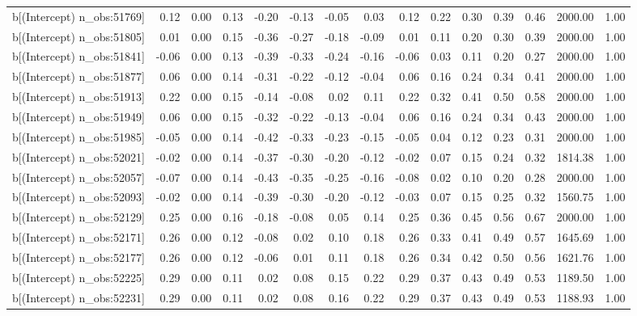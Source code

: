 \begin{table}[ht]
\begin{tabular}{rrrrrrrrrrrrrrr}
  b[(Intercept) n\_obs:51769] & 0.12 & 0.00 & 0.13 & -0.20 & -0.13 & -0.05 & 0.03 & 0.12 & 0.22 & 0.30 & 0.39 & 0.46 & 2000.00 & 1.00 \\ 
  b[(Intercept) n\_obs:51805] & 0.01 & 0.00 & 0.15 & -0.36 & -0.27 & -0.18 & -0.09 & 0.01 & 0.11 & 0.20 & 0.30 & 0.39 & 2000.00 & 1.00 \\ 
  b[(Intercept) n\_obs:51841] & -0.06 & 0.00 & 0.13 & -0.39 & -0.33 & -0.24 & -0.16 & -0.06 & 0.03 & 0.11 & 0.20 & 0.27 & 2000.00 & 1.00 \\ 
  b[(Intercept) n\_obs:51877] & 0.06 & 0.00 & 0.14 & -0.31 & -0.22 & -0.12 & -0.04 & 0.06 & 0.16 & 0.24 & 0.34 & 0.41 & 2000.00 & 1.00 \\ 
  b[(Intercept) n\_obs:51913] & 0.22 & 0.00 & 0.15 & -0.14 & -0.08 & 0.02 & 0.11 & 0.22 & 0.32 & 0.41 & 0.50 & 0.58 & 2000.00 & 1.00 \\ 
  b[(Intercept) n\_obs:51949] & 0.06 & 0.00 & 0.15 & -0.32 & -0.22 & -0.13 & -0.04 & 0.06 & 0.16 & 0.24 & 0.34 & 0.43 & 2000.00 & 1.00 \\ 
  b[(Intercept) n\_obs:51985] & -0.05 & 0.00 & 0.14 & -0.42 & -0.33 & -0.23 & -0.15 & -0.05 & 0.04 & 0.12 & 0.23 & 0.31 & 2000.00 & 1.00 \\ 
  b[(Intercept) n\_obs:52021] & -0.02 & 0.00 & 0.14 & -0.37 & -0.30 & -0.20 & -0.12 & -0.02 & 0.07 & 0.15 & 0.24 & 0.32 & 1814.38 & 1.00 \\ 
  b[(Intercept) n\_obs:52057] & -0.07 & 0.00 & 0.14 & -0.43 & -0.35 & -0.25 & -0.16 & -0.08 & 0.02 & 0.10 & 0.20 & 0.28 & 2000.00 & 1.00 \\ 
  b[(Intercept) n\_obs:52093] & -0.02 & 0.00 & 0.14 & -0.39 & -0.30 & -0.20 & -0.12 & -0.03 & 0.07 & 0.15 & 0.25 & 0.32 & 1560.75 & 1.00 \\ 
  b[(Intercept) n\_obs:52129] & 0.25 & 0.00 & 0.16 & -0.18 & -0.08 & 0.05 & 0.14 & 0.25 & 0.36 & 0.45 & 0.56 & 0.67 & 2000.00 & 1.00 \\ 
  b[(Intercept) n\_obs:52171] & 0.26 & 0.00 & 0.12 & -0.08 & 0.02 & 0.10 & 0.18 & 0.26 & 0.33 & 0.41 & 0.49 & 0.57 & 1645.69 & 1.00 \\ 
  b[(Intercept) n\_obs:52177] & 0.26 & 0.00 & 0.12 & -0.06 & 0.01 & 0.11 & 0.18 & 0.26 & 0.34 & 0.42 & 0.50 & 0.56 & 1621.76 & 1.00 \\ 
  b[(Intercept) n\_obs:52225] & 0.29 & 0.00 & 0.11 & 0.02 & 0.08 & 0.15 & 0.22 & 0.29 & 0.37 & 0.43 & 0.49 & 0.53 & 1189.50 & 1.00 \\ 
  b[(Intercept) n\_obs:52231] & 0.29 & 0.00 & 0.11 & 0.02 & 0.08 & 0.16 & 0.22 & 0.29 & 0.37 & 0.43 & 0.49 & 0.53 & 1188.93 & 1.00 \\ 

\end{tabular}
\end{table}
